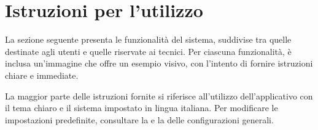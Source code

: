 \section{Istruzioni per l'utilizzo}

\par La sezione seguente presenta le funzionalità del sistema, suddivise tra quelle destinate agli utenti e quelle riservate ai tecnici. Per ciascuna funzionalità, è inclusa un'immagine che offre un esempio visivo, con l'intento di fornire istruzioni chiare e immediate.

\par La maggior parte delle istruzioni fornite si riferisce all'utilizzo dell'applicativo con il tema chiaro e il sistema impostato in lingua italiana. Per modificare le impostazioni predefinite, consultare la  e la  delle configurazioni generali.







